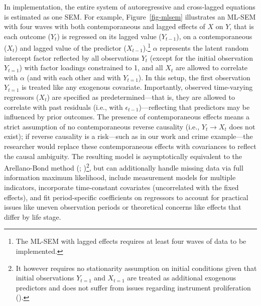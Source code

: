 \documentclass[
  letterpaper,
  DIV=11,
  numbers=noendperiod]{scrartcl}
\begin{document}
In implementation, the entire system of autoregressive and cross‐lagged
equations is estimated as one SEM. For example, Figure~\ref{fig-mlsem}
illustrates an ML-SEM with four waves with both contemporaneous and
lagged effects of \(X\) on \(Y\), that is each outcome (\(Y_t\)) is
regressed on its lagged value (\(Y_{t-1}\)), on a contemporaneous
(\(X_t\)) and lagged value of the predictor (\(X_{t-1}\)).\footnote{The
  ML-SEM with lagged effects requires at least four waves of data to be
  implemented.} \(\alpha\) represents the latent random intercept factor
reflected by all observations \(Y_t\) (except for the initial
observation \(Y_{t=1}\)) with factor loadings constrained to 1, and all
\(X_t\) are allowed to correlate with \(\alpha\) (and with each other
and with \(Y_{t=1}\)). In this setup, the first observation \(Y_{t=1}\)
is treated like any exogenous covariate. Importantly, observed
time-varying regressors (\(X_t\)) are specified as predetermined---that
is, they are allowed to correlate with past residuals (i.e., with
\(\epsilon_{t-1}\))---reflecting that predictors may be influenced by
prior outcomes. The presence of contemporaneous effects means a strict
assumption of no contemporaneous reverse causality (i.e.,
\(Y_t \rightarrow X_t\) does not exist); if reverse causality is a
risk---such as in our work and crime example---the researcher would
replace these contemporaneous effects with covariances to reflect the
causal ambiguity. The resulting model is asymptotically equivalent to
the Arellano-Bond method (; )\footnote{It however requires no stationarity
  assumption on initial conditions given that initial observations
  \(Y_{t=1}\) and \(X_{t=1}\) are treated as additional exogenous
  predictors and does not suffer from issues regarding instrument
  proliferation ().}, but can additionally handle missing data
via full information maximum likelihood, include measurement models for
multiple indicators, incorporate time-constant covariates (uncorrelated
with the fixed effects), and fit period-specific coefficients on
regressors to account for practical issues like uneven observation
periods or theoretical concerns like effects that differ by life stage.
\end{document}
